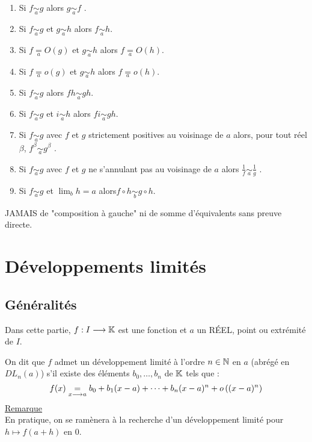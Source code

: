 \begin{defprop}
    \begin{enumerate}
    \item Si \(f \underset{a}{\sim} g\) alors \(g \underset{a}{\sim} f\) .
    \item Si \(f \underset{a}{\sim} g\) et \(g \underset{a}{\sim} h\) alors \(f \underset{a}{\sim} h\).
    \item Si \(f \underset{a}{=} O (g)\) et \(g \underset{a}{\sim} h\) alors \(f \underset{a}{=} O (h)\).
    \item Si \(f \underset{a}{=} o (g)\) et \(g \underset{a}{\sim} h\) alors \(f \underset{a}{=} o (h)\).
    \item Si \(f \underset{a}{\sim} g\) alors \(f h \underset{a}{\sim} gh\).
    \item Si \(f \underset{a}{\sim} g\) et \(i \underset{a}{\sim} h\) alors \(f i \underset{a}{\sim} gh\).
    \item Si \(f \underset{a}{\sim} g\) avec \(f\) et \(g\) strictement positives au voisinage de \(a\) alors, pour tout réel \(\beta\), \(f ^{\beta} \underset{a}{\sim} g^{\beta}\) .
    \item Si \(f \underset{a}{\sim} g\) avec \(f\) et \(g\) ne s’annulant pas au voisinage de \(a\) alors \(\frac{1}{f} \underset{a}{\sim}\frac{1}{g}\) .
    \item Si \(f \underset{a}{\sim} g\) et \(\lim_{b} h = a\) alors\( f \circ h \underset{b}{\sim}g \circ h\).
    \end{enumerate}
    JAMAIS de "composition à gauche" ni de somme d’équivalents sans preuve directe.
\end{defprop}

\section{Développements limités}
\subsection{Généralités}
    Dans cette partie, \(f : I \longrightarrow  \mathbb{K}\) est une fonction et \(a\) un RÉEL, point ou extrémité de \(I\).
\begin{defi}
    On dit que \(f\) admet un développement limité à l’ordre \(n \in  \mathbb{N}\) en \(a\) (abrégé en \(DL_n(a)\)) s’il existe des éléments \(b_0, \dots, b_n\) de \(\mathbb{K}\) tels que :
    \[f (x) \underset{x\longrightarrow a}{=} b_0 + b_1(x - a) + \dots + b_n(x - a)^n + o \left((x - a)^n\right)\]
    \underline{Remarque}\\
    En pratique, on se ramènera à la recherche d’un développement limité pour \(h \mapsto  f (a + h)\) en \(0\).
\end{defi}

